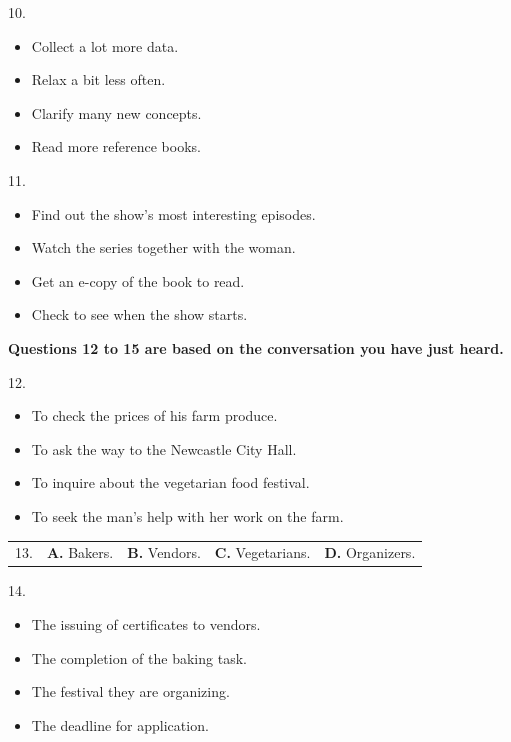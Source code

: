 \documentclass[UTF8,11pt]{ctexart}
\begin{document}
10.


\begin{itemize}[leftmargin=2em,itemsep=.2em,topsep=.4em]\item[A.] Collect a lot more data.
\item[B.] Relax a bit less often.
\item[C.] Clarify many new concepts.
\item[D.] Read more reference books.
\end{itemize}

11.


\begin{itemize}[leftmargin=2em,itemsep=.2em,topsep=.4em]\item[A.] Find out the show’s most interesting episodes.
\item[B.] Watch the series together with the woman.
\item[C.] Get an e-copy of the book to read.
\item[D.] Check to see when the show starts.
\end{itemize}

\textbf{Questions 12 to 15 are based on the conversation you have just heard.}


12.


\begin{itemize}[leftmargin=2em,itemsep=.2em,topsep=.4em]\item[A.] To check the prices of his farm produce.
\item[B.] To ask the way to the Newcastle City Hall.
\item[C.] To inquire about the vegetarian food festival.
\item[D.] To seek the man’s help with her work on the farm.
\end{itemize}

\noindent\begin{tabularx}{\linewidth}{@{}lXXXX@{}}13. & \textbf{A.} Bakers. & \textbf{B.} Vendors. & \textbf{C.} Vegetarians. & \textbf{D.} Organizers.\\\end{tabularx}\par

14.


\begin{itemize}[leftmargin=2em,itemsep=.2em,topsep=.4em]\item[A.] The issuing of certificates to vendors.
\item[B.] The completion of the baking task.
\item[C.] The festival they are organizing.
\item[D.] The deadline for application.
\end{itemize}
\end{document}
